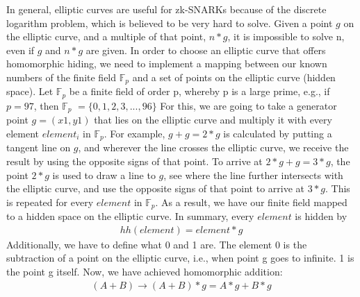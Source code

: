In general, elliptic curves are useful for zk-SNARKs because of the discrete logarithm problem, which is believed to be very hard to solve. Given a point \(g\) on the elliptic curve, and a multiple of that point, \(n*g\), it is impossible to solve n, even if \(g\) and \(n*g\) are given. In order to choose an elliptic curve that offers homomorphic hiding, we need to implement a mapping between our known numbers of the finite field \begin{math}\mathbb{F}_p\end{math} and a set of points on the elliptic curve (hidden space). Let \begin{math}\mathbb{F}_p\end{math} be a finite field of order p, whereby p is a large prime, e.g., if \(p=97\), then \begin{math}\mathbb{F}_p\end{math} \(=\{0, 1, 2, 3, ..., 96\}\) For this, we are going to take a generator point \(g = (x1,y1)\) that lies on the elliptic curve and multiply it with every element \({element}_i\) in \begin{math}\mathbb{F}_p\end{math}. For example, \(g + g = 2*g\) is calculated by putting a tangent line on \(g\), and wherever the line crosses the elliptic curve, we receive the result by using the opposite signs of that point. To arrive at \(2*g + g = 3*g\), the point \(2*g\) is used to draw a line to \(g\), see where the line further intersects with the elliptic curve, and use the opposite signs of that point to arrive at \(3*g\). This is repeated for every \(element\) in \begin{math}\mathbb{F}_p\end{math}. As a result, we have our finite field mapped to a hidden space on the elliptic curve. In summary, every \(element\) is hidden by
\begin{align}
    hh(element) = element * g
\end{align}
Additionally, we have to define what 0 and 1 are. The element 0 is the subtraction of a point on the elliptic curve, i.e., when point g goes to infinite. 1 is the point g itself.
Now, we have achieved homomorphic addition:
\begin{align}
    (A + B) \longrightarrow (A + B) * g = A*g + B*g
\end{align}

